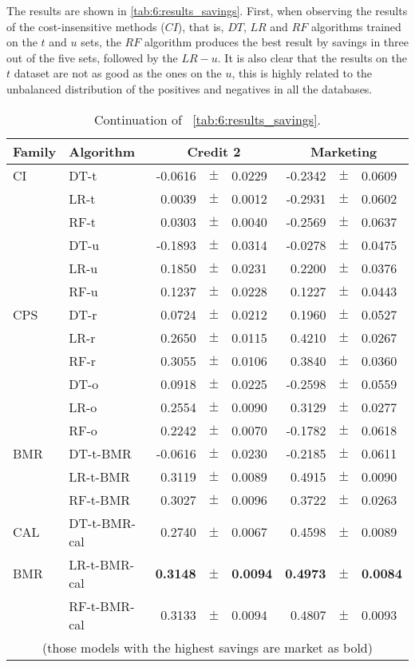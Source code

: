 The results are shown in \tablename{ \ref{tab:6:results_savings}}. First, when observing  the 
results of the cost-insensitive methods ($CI$), that is, $DT$, $LR$ and $RF$ algorithms trained 
on the $t$ and $u$ sets, the $RF$ algorithm produces the best result by savings in three out of 
the five sets, followed by the $LR-u$. It is also clear that the results on the $t$ dataset are 
not as good as the ones on the $u$, this is highly related to the unbalanced distribution of the 
positives and negatives in all the databases.  
  
\begin{table}[!t]
    \centering
    \footnotesize
    \begin{tabular}{l l r@{\hskip 0in}c@{\hskip 0in}l r@{\hskip 0in}c@{\hskip 0in}l  } %
    \hline
    \bf{Family} & \bf{Algorithm} &  \multicolumn{3}{c}{\bf{Credit 2}} 
& \multicolumn{3}{c}{\bf{Marketing}} \\ 
    \hline
CI&DT-t & -0.0616 &$\pm$& 0.0229 & -0.2342 &$\pm$& 0.0609\\ 
&LR-t & 0.0039 &$\pm$& 0.0012 & -0.2931 &$\pm$& 0.0602\\ 
&RF-t & 0.0303 &$\pm$& 0.0040 & -0.2569 &$\pm$& 0.0637\\ 
&DT-u & -0.1893 &$\pm$& 0.0314 & -0.0278 &$\pm$& 0.0475\\ 
&LR-u & 0.1850 &$\pm$& 0.0231 & 0.2200 &$\pm$& 0.0376\\ 
&RF-u & 0.1237 &$\pm$& 0.0228 & 0.1227 &$\pm$& 0.0443\\ 
\hline 
CPS&DT-r & 0.0724 &$\pm$& 0.0212 & 0.1960 &$\pm$& 0.0527\\ 
&LR-r & 0.2650 &$\pm$& 0.0115 & 0.4210 &$\pm$& 0.0267\\ 
&RF-r & 0.3055 &$\pm$& 0.0106 & 0.3840 &$\pm$& 0.0360\\ 
&DT-o & 0.0918 &$\pm$& 0.0225 & -0.2598 &$\pm$& 0.0559\\ 
&LR-o & 0.2554 &$\pm$& 0.0090 & 0.3129 &$\pm$& 0.0277\\ 
&RF-o & 0.2242 &$\pm$& 0.0070 & -0.1782 &$\pm$& 0.0618\\ 
\hline 
BMR&DT-t-BMR & -0.0616 &$\pm$& 0.0230 & -0.2185 &$\pm$& 0.0611\\ 
&LR-t-BMR & 0.3119 &$\pm$& 0.0089 & 0.4915 &$\pm$& 0.0090\\ 
&RF-t-BMR & 0.3027 &$\pm$& 0.0096 & 0.3722 &$\pm$& 0.0263\\ 
\hline 
CAL&DT-t-BMR-cal & 0.2740 &$\pm$& 0.0067 & 0.4598 &$\pm$& 0.0089\\ 
BMR&LR-t-BMR-cal & \bf{0.3148} &\bf{$\pm$}& \bf{0.0094} & \bf{0.4973} &\bf{$\pm$}& \bf{0.0084}\\ 
&RF-t-BMR-cal & 0.3133 &$\pm$& 0.0094 & 0.4807 &$\pm$& 0.0093\\ 

\hline 
  \multicolumn{8}{c}{(those models with the highest savings are market as bold)}
  \end{tabular}
    \caption{Continuation of \tablename{~\ref{tab:6:results_savings}}.}
    \label{tab:6:results_savings2}
  \end{table}
  
